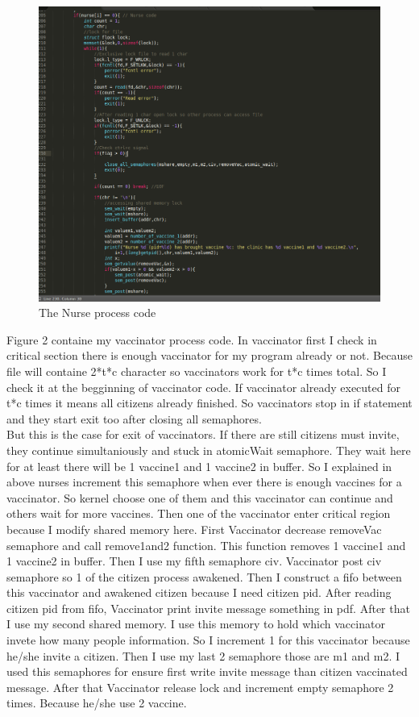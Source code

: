 \documentclass{article}
\begin{document}
\begin{figure}[h!]
\centering
\includegraphics[scale=0.35]{nurse.png}
\caption{The Nurse process code}
\label{fig:nurse}
\end{figure}
\newpage
Figure 2 containe my vaccinator process code. In vaccinator first I check in critical section there is enough vaccinator for my program already or not. Because file will containe 2*t*c character so vaccinators work for t*c times total. So I check it at the begginning of vaccinator code. If vaccinator already executed for t*c times it means all citizens already finished. So vaccinators stop in if statement and they start exit too after closing all semaphores. \\
But this is the case for exit of vaccinators. If there are still citizens must invite, they continue simultaniously and stuck in atomicWait semaphore. They wait here for at least there will be 1 vaccine1 and 1 vaccine2 in buffer. So I explained in above nurses increment this semaphore when ever there is enough vaccines for a vaccinator. So kernel choose one of them and this vaccinator can continue and others wait for more vaccines. Then one of the vaccinator enter critical region because I modify shared memory here. First Vaccinator decrease removeVac semaphore and call remove1and2 function. This function removes 1 vaccine1 and 1 vaccine2 in buffer. Then I use my fifth semaphore civ. Vaccinator post civ semaphore so 1 of the citizen process awakened. Then I construct a fifo between this vaccinator and awakened citizen because I need citizen pid. After reading citizen pid from fifo, Vaccinator print invite message something in pdf. After that I use my second shared memory. I use this memory to hold which vaccinator invete how many people information. So I increment 1 for this vaccinator because he/she invite a citizen. Then I use my last 2 semaphore those are m1 and m2. I used this semaphores for ensure first write invite message than citizen vaccinated message. After that Vaccinator release lock and increment empty semaphore 2 times. Because he/she use 2 vaccine. \\
\end{document}
